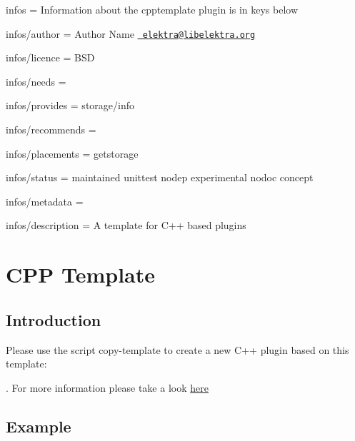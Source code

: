 
\begin{DoxyItemize}
\item infos = Information about the cpptemplate plugin is in keys below
\item infos/author = Author Name \href{mailto:elektra@libelektra.org}{\texttt{ elektra@libelektra.\+org}}
\item infos/licence = B\+SD
\item infos/needs =
\item infos/provides = storage/info
\item infos/recommends =
\item infos/placements = getstorage
\item infos/status = maintained unittest nodep experimental nodoc concept
\item infos/metadata =
\item infos/description = A template for C++ based plugins
\end{DoxyItemize}\hypertarget{autotoc_md110_src_plugins_cpptemplate_README_md}{}\section{C\+P\+P Template}\label{autotoc_md110_src_plugins_cpptemplate_README_md}
\hypertarget{autotoc_md110_autotoc_md111}{}\subsection{Introduction}\label{autotoc_md110_autotoc_md111}
Please use the script copy-\/template to create a new C++ plugin based on this template\+:


\begin{DoxyCode}{0}
\end{DoxyCode}


. For more information please take a look \mbox{\hyperlink{autotoc_md684_src_plugins_template_README_md}{here}}\hypertarget{autotoc_md110_autotoc_md112}{}\subsection{Example}\label{autotoc_md110_autotoc_md112}

\begin{DoxyCode}{0}
\DoxyCodeLine{}
\DoxyCodeLine{}
\DoxyCodeLine{}
\DoxyCodeLine{}
\end{DoxyCode}
 